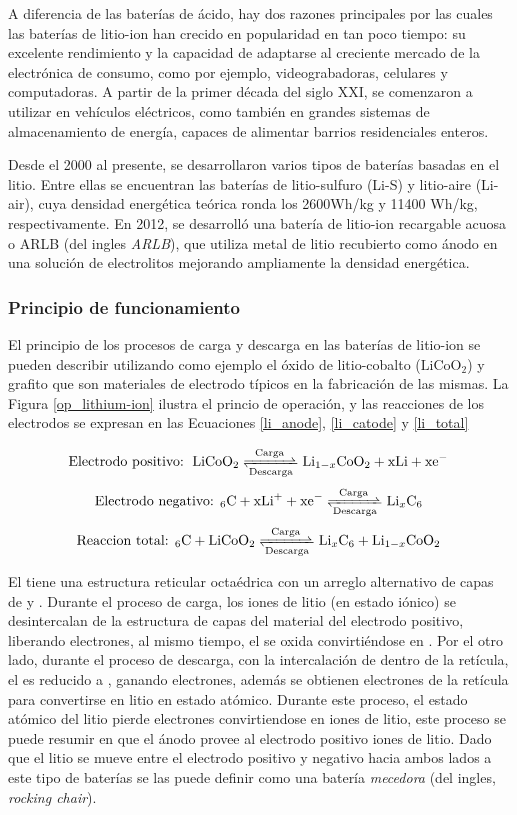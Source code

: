 \documentclass[10pt,a4paper]{article}
\newcommand\reaction[1]{\begin{equation}\ce{#1}\end{equation}}
\begin{document}
\newpage

\noindent A diferencia de las baterías de ácido, hay dos razones principales por
las cuales las baterías de litio-ion han crecido en popularidad en tan poco
tiempo: su excelente rendimiento y la capacidad de adaptarse al creciente
mercado de la electrónica de consumo, como por ejemplo, videograbadoras,
celulares y computadoras. A partir de la primer década del siglo XXI, se
comenzaron a utilizar en vehículos eléctricos, como también en grandes sistemas
de almacenamiento de energía, capaces de alimentar barrios residenciales
enteros.

\noindent Desde el 2000 al presente, se desarrollaron varios tipos de 
bater\'ias basadas en el litio. Entre ellas se encuentran las bater\'ias de 
litio-sulfuro (Li-S) y litio-aire (Li-air), cuya densidad energética teórica 
ronda los 2600Wh/kg y 11400 Wh/kg, respectivamente. En 2012, se desarrolló una 
batería de litio-ion recargable acuosa o \acrshort{ARLB} (del ingles
\emph{\acrlong{ARLB}}), que utiliza metal de litio recubierto como ánodo en una
solución de electrolitos mejorando ampliamente la densidad energética.

\subsubsection{Principio de funcionamiento}\label{battery_fun}

El principio de los procesos de carga y descarga en las baterías de litio-ion se
pueden describir utilizando como ejemplo el óxido de litio-cobalto 
($\mathrm{LiCoO_2}$) y grafito que son materiales de electrodo t\'ipicos en la
fabricaci\'on de las mismas. La Figura \ref{op_lithium-ion} ilustra el
princio de operación, y las reacciones de los electrodos se expresan en  las
Ecuaciones \ref{li_anode}, \ref{li_catode} y \ref{li_total}

\reaction{\text{Electrodo positivo: } LiCoO2 <=>[Carga][Descarga] Li_{1-x}CoO2 + xLi + xe^- \label{li_anode}}
\reaction{\text{Electrodo negativo: }6C + xLi^+ + xe^- <=>[Carga][Descarga] Li_{x}C6 \label{li_catode}}
\reaction{\text{Reaccion total: }6C + LiCoO2 <=>[Carga][Descarga] Li_{x}C6 + Li_{1-x}CoO2 \label{li_total}}

\noindent El  tiene una estructura reticular octa\'edrica con un
arreglo alternativo de capas de  y . Durante el proceso de
carga, los iones de litio (en estado iónico) se desintercalan de la estructura
de capas del material del electrodo positivo, liberando electrones, al mismo
tiempo, el  se oxida convirti\'endose en .  Por el otro
lado, durante el proceso de descarga, con la intercalación de  dentro de
la ret\'icula, el  es reducido a , ganando electrones,
adem\'as se obtienen electrones de la ret\'icula para convertirse en litio en 
estado atómico. Durante este proceso, el estado atómico del litio pierde 
electrones convirtiendose en iones de litio, este proceso se puede resumir en 
que el ánodo provee al electrodo positivo iones de litio. Dado que el litio se 
mueve entre el electrodo positivo y negativo hacia ambos lados a este tipo de 
baterías se las puede definir como una batería \emph{mecedora} (del ingles,
\emph{rocking chair}).
\end{document}
